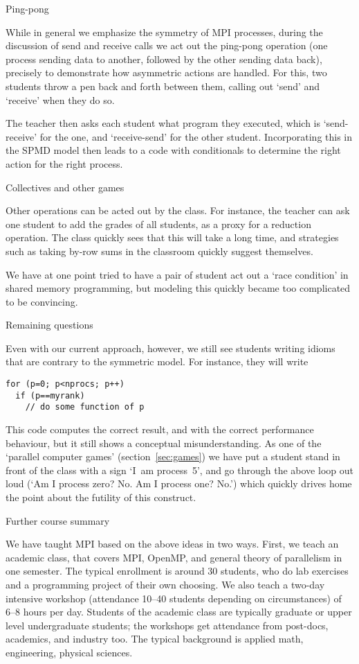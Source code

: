  {Ping-pong}

While in general we emphasize the symmetry of MPI processes, during
the discussion of send and receive calls we act out the ping-pong
operation (one process sending data to another, followed by the other
sending data back), precisely to demonstrate how asymmetric actions
are handled. For this, two students throw a pen back and forth between
them, calling out `send' and `receive' when they do so.

The teacher then asks each student what program they executed, which
is `send-receive' for the one, and `receive-send' for the other
student. Incorporating this in the SPMD model then leads to a code
with conditionals to determine the right action for the right process.

 {Collectives and other games}

Other operations can be acted out by the class. For instance, the
teacher can ask one student to add the grades of all students, as a
proxy for a reduction operation. The class quickly sees that this will
take a long time, and strategies such as taking by-row sums in the
classroom quickly suggest themselves.

We have at one point tried to have a pair of student act out a `race
condition' in shared memory programming, but modeling this quickly
became too complicated to be convincing.

 {Remaining questions}
\label{sec:ploop}

Even with our current approach, however, we still see students writing
idioms that are contrary to the symmetric model. For instance, they
will write
\begin{verbatim}
for (p=0; p<nprocs; p++)
  if (p==myrank)
    // do some function of p
\end{verbatim}
This code computes the correct result, and with the correct
performance behaviour, but it still shows a conceptual
misunderstanding. As one of the `parallel computer games'
(section~\ref{sec:games}) we have put a student stand in front of the
class with a sign `I~am process~5', and go through the above loop
out loud (`Am I process zero? No. Am I process one? No.') which
quickly drives home the point about the futility of this construct.

 {Further course summary}
\label{sec:course}

We have taught MPI based on the above ideas in two ways.
First, we teach an academic class,
that covers MPI, OpenMP, and general theory of parallelism in one semester.
The typical enrollment is around 30 students, who do lab exercises and
a programming project of their own choosing.
We also teach a two-day intensive workshop (attendance 10--40 students depending
on circumstances) of 6--8 hours per day. Students of the academic class are typically
graduate or upper level undergraduate students; the workshops get
attendance from post-docs, academics, and industry too. The typical
background is applied math, engineering, physical sciences.

